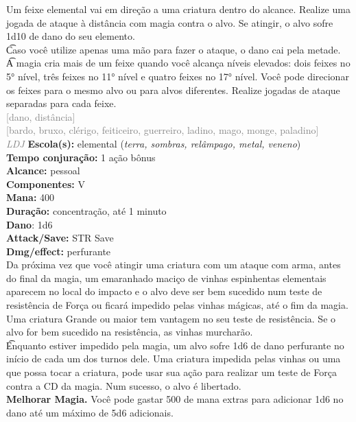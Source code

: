 \documentclass{RPG_Adventure}[2021/10/20]
\begin{document}
{\normalsize Um feixe elemental vai em direção a uma criatura dentro do alcance. Realize uma jogada de ataque à distância com magia contra o alvo. Se atingir, o alvo sofre 1d10 de dano do seu elemento.\\\t Caso você utilize apenas uma mão para fazer o ataque, o dano cai pela metade.\\\t A magia cria mais de um feixe quando você alcança níveis elevados: dois feixes no 5° nível, três feixes no 11° nível e quatro feixes no 17° nível. Você pode direcionar os feixes para o mesmo alvo ou para alvos diferentes. Realize jogadas de ataque separadas para cada feixe.\\}
{\scriptsize \textcolor{gray}{[dano, distância]\\}}
{\scriptsize \textcolor{gray}{[bardo, bruxo, clérigo, feiticeiro, guerreiro, ladino, mago, monge, paladino]\\}}
{\tiny \textcolor{gray}{\textit{LDJ}}}
{\small \t \textbf{Escola(s):} elemental (\textit{terra, sombras, relâmpago, metal, veneno})\\\t \textbf{Tempo conjuração:} 1 ação bônus\\\t \textbf{Alcance:} pessoal\\\t \textbf{Componentes:} V\\\t \textbf{Mana:} 400\\\t \textbf{Duração:} concentração, até 1 minuto\\\t \textbf{Dano}: 1d6\\\t \textbf{Attack/Save:} STR Save\\\t \textbf{Dmg/effect:} perfurante\\}
{\normalsize Da próxima vez que você atingir uma criatura com um ataque com arma, antes do final da magia, um emaranhado maciço de vinhas espinhentas elementais aparecem no local do impacto e o alvo deve ser bem sucedido num teste de resistência de Força ou ficará impedido pelas vinhas mágicas, até o fim da magia. Uma criatura Grande ou maior tem vantagem no seu teste de resistência. Se o alvo for bem sucedido na resistência, as vinhas murcharão.\\\t Enquanto estiver impedido pela magia, um alvo sofre 1d6 de dano perfurante no início de cada um dos turnos dele. Uma criatura impedida pelas vinhas ou uma que possa tocar a criatura, pode usar sua ação para realizar um teste de Força contra a CD da magia. Num sucesso, o alvo é libertado.\\\t \textbf{Melhorar Magia.} Você pode gastar 500 de mana extras para adicionar 1d6 no dano até um máximo de 5d6 adicionais.\\}
\end{document}
